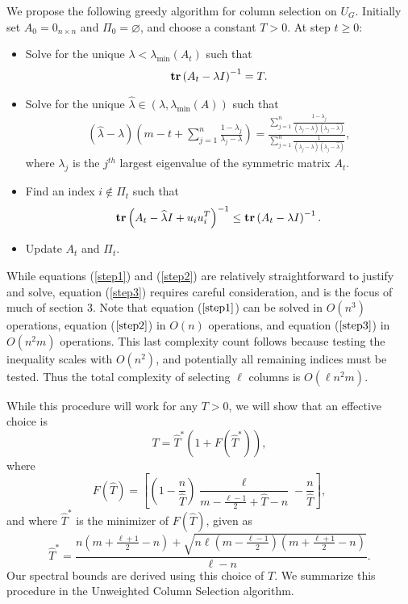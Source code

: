 \documentclass[final,leqno,onefignum,onetabnum]{siamltex1213}
\begin{document}
We propose the following greedy algorithm for column selection on $U_G$.  Initially set $A_0=0_{n \times n}$ and $\Pi_0=\varnothing$, and
choose a constant $T>0$. At step $t \geq 0$:
\begin{itemize}
\item Solve for the unique $\lambda < \lambda_{\min}\left(A_t\right)$ such that
\begin{eqnarray}
\text{\bf tr}\left(A_t-\lambda I\right)^{-1}=T . \label{step1}
\end{eqnarray}
\item Solve for the unique $\widehat{\lambda} \in \left(\lambda,
\lambda_{\min}\left(A\right)\right)$ such that
\begin{eqnarray}
{\displaystyle \left(\widehat{\lambda}-\lambda\right)\left(m-t+\sum_{j=1}^n\frac{1-\lambda_j}{\lambda_j-\lambda}\right)} ={\displaystyle \frac{\sum_{j=1}^n\frac{1-\lambda_j}{\left(\lambda_j-\lambda\right)\left(\lambda_j-\widehat{\lambda}\right)}}{\sum_{j=1}^n\frac{1}{\left(\lambda_j-\lambda\right)\left(\lambda_j-\widehat{\lambda}\right)}} ,}\label{step2}
\end{eqnarray}
where $\lambda_j$ is the $j^{th}$ largest eigenvalue of the symmetric matrix $A_t$.
\item Find an index $i\notin\Pi_t$ such that 
\begin{eqnarray}
{\displaystyle \text{\bf tr}\left(A_t-\widehat{\lambda}I+{u}_i{u}_i^T\right)^{-1}} \leq {\displaystyle \text{\bf tr}\left(A_t-\lambda I\right)^{-1}.} \label{step3}
\end{eqnarray}
\item Update $A_t$ and $\Pi_t$. 
\end{itemize}

While equations (\ref{step1}) and (\ref{step2}) are relatively straightforward to justify and solve, equation (\ref{step3}) requires careful consideration, and is the focus of much of section 3.  Note that equation ($\ref{step1}$) can be solved in $O\left(n^3\right)$ operations, equation ($\ref{step2}$) in $O\left(n\right)$ operations, and equation ($\ref{step3}$) in $O\left(n^2m\right)$ operations.  This last complexity count follows because testing the inequality scales with $O\left(n^2\right)$, and potentially all remaining indices must be tested.  Thus the total complexity of selecting $\ell$ columns is $O\left(\ell n^2m\right)$.

While this procedure will work for any $T > 0$, we will show that an effective choice is
\begin{equation}T=\widehat{T}^*\left(1+F\left(\widehat{T}^*\right)\right),\nonumber
\end{equation}
where 
$$F\left(\widehat{T}\right)=\left[\left(1-\frac{n}{\widehat{T}}\right)\frac{\ell}{m-\frac{\ell-1}{2}+\widehat{T}-n}-\frac{n}{\widehat{T}}\right],$$
and where $\widehat{T}^*$ is the minimizer of $F\left(\widehat{T}\right)$, given as
$$\widehat{T}^*=\frac{n\left(m+\frac{\ell+1}{2}-n\right)+\sqrt{n\ell\left(m-\frac{\ell-1}{2}\right)\left(m+\frac{\ell+1}{2}-n\right)}}{\ell-n}.$$
Our spectral bounds are derived using this choice of $T$.  We summarize this procedure in the Unweighted Column Selection algorithm.
\end{document}
